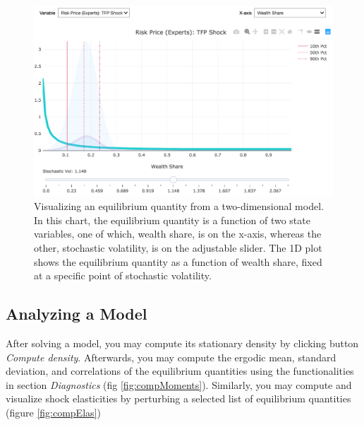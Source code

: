 \documentclass[12pt]{article}
\begin{document}
\begin{figure}[H]
\centering
\includegraphics[scale=0.4]{sliderJupyter}
\caption{Visualizing an equilibrium quantity from a two-dimensional model. In this chart, the equilibrium quantity is a function of two state variables, one of which, wealth share, is on the x-axis, whereas the other, stochastic volatility, is on the adjustable slider. The 1D plot shows the equilibrium quantity as a function of wealth share, fixed at a specific point of stochastic volatility.}\label{fig:viz2d}
\end{figure}

\subsection{Analyzing a Model}
After solving a model, you may compute its stationary density by clicking button \textit{Compute density}. Afterwards, you may compute the ergodic mean, standard deviation, and correlations of the equilibrium quantities using the functionalities in section \textit{Diagnostics} (fig \ref{fig:compMoments}). Similarly, you may compute and visualize shock elasticities by perturbing a selected list of equilibrium quantities (figure \ref{fig:compElas})
\end{document}
